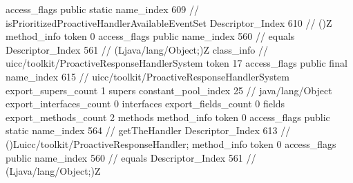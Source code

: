 {{{{{					access_flags	public static
					name_index	609		// isPrioritizedProactiveHandlerAvailableEventSet
					Descriptor_Index	610		// ()Z
				}
				method_info {
					token	0
					access_flags	public
					name_index	560		// equals
					Descriptor_Index	561		// (Ljava/lang/Object;)Z
				}
			}
		}
		class_info {		// uicc/toolkit/ProactiveResponseHandlerSystem
			token	17
			access_flags	public final
			name_index	615		// uicc/toolkit/ProactiveResponseHandlerSystem
			export_supers_count	1
			supers {
				constant_pool_index	25		// java/lang/Object
			}
			export_interfaces_count	0
			interfaces {
			}
			export_fields_count	0
			fields {
			}
			export_methods_count	2
			methods {
				method_info {
					token	0
					access_flags	public static
					name_index	564		// getTheHandler
					Descriptor_Index	613		// ()Luicc/toolkit/ProactiveResponseHandler;
				}
				method_info {
					token	0
					access_flags	public
					name_index	560		// equals
					Descriptor_Index	561		// (Ljava/lang/Object;)Z
				}
			}
		}
	}
}
